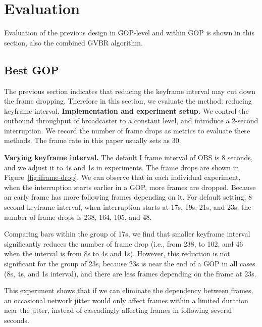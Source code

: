 \section{Evaluation}
\vspace{-0.05in}
Evaluation of the previous design in GOP-level and within GOP is shown in this section, also the combined GVBR algorithm.
\subsection{Best GOP}
The previous section indicates that reducing the keyframe interval may cut down the frame dropping. Therefore in this section, we evaluate the method: reducing keyframe interval.
\textbf{Implementation and experiment setup.}
We control the outbound throughput of broadcaster to a constant level, and introduce a 2-second interruption. We record the number of frame drops as metrics to evaluate these methods. The frame rate in this paper usually sets as 30.


\textbf{Varying keyframe interval.} The default I frame interval of OBS is 8 seconds, and we adjust it to 4s and 1s in experiments. The frame drops are shown in Figure~\ref{fig:iframe-drop}. We can observe that in each individual experiment, when the interruption starts earlier in a GOP, more frames are dropped. Because an early frame has more following frames depending on it. For default setting, 8 second keyframe interval, when interruption starts at 17s, 19s, 21s, and 23s, the number of frame drops is 238, 164, 105, and 48.
\iffalse
Also, the number of frame drop appears to have the same period with the keyframe interval (e.g., when keyframe interval is 4s, the number of frame drops is 102, 47, 103, and 48 when interruption starts at 17s, 19s, 21s, and 23s, demonstrating a period of 4s.).
\fi
Comparing bars within the group of 17s, we find that smaller keyframe interval significantly reduces the number of frame drop (i.e., from 238, to 102, and 46 when the interval is from 8s to 4s and 1s). However, this reduction is not significant for the group of 23s, because 23s is near the end of a GOP in all cases (8s, 4s, and 1s interval), and there are less frames depending on the frame at 23s.

This experiment shows that if we can eliminate the dependency between frames, an occasional network jitter would only affect frames within a limited duration near the jitter, instead of cascadingly affecting frames in following several seconds.

